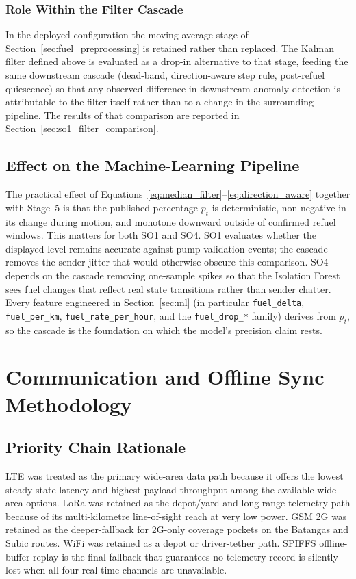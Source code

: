 \subsubsection{Role Within the Filter Cascade}
\label{sec:kalman_role_in_cascade}

In the deployed configuration the moving-average stage of Section~\ref{sec:fuel_preprocessing} is retained rather than replaced. The Kalman filter defined above is evaluated as a drop-in alternative to that stage, feeding the same downstream cascade (dead-band, direction-aware step rule, post-refuel quiescence) so that any observed difference in downstream anomaly detection is attributable to the filter itself rather than to a change in the surrounding pipeline. The results of that comparison are reported in Section~\ref{sec:so1_filter_comparison}.

\subsection{Effect on the Machine-Learning Pipeline}

The practical effect of Equations~\ref{eq:median_filter}--\ref{eq:direction_aware} together with Stage~5 is that the published percentage $p_t$ is deterministic, non-negative in its change during motion, and monotone downward outside of confirmed refuel windows. This matters for both SO1 and SO4. SO1 evaluates whether the displayed level remains accurate against pump-validation events; the cascade removes the sender-jitter that would otherwise obscure this comparison. SO4 depends on the cascade removing one-sample spikes so that the Isolation Forest sees fuel changes that reflect real state transitions rather than sender chatter. Every feature engineered in Section~\ref{sec:ml} (in particular \texttt{fuel\_delta}, \texttt{fuel\_per\_km}, \texttt{fuel\_rate\_per\_hour}, and the \texttt{fuel\_drop\_*} family) derives from $p_t$, so the cascade is the foundation on which the model's precision claim rests.

\section{Communication and Offline Sync Methodology}
\label{sec:communication}

\subsection{Priority Chain Rationale}
LTE was treated as the primary wide-area data path because it offers the lowest steady-state latency and highest payload throughput among the available wide-area options. LoRa was retained as the depot/yard and long-range telemetry path because of its multi-kilometre line-of-sight reach at very low power. GSM 2G was retained as the deeper-fallback for 2G-only coverage pockets on the Batangas and Subic routes. WiFi was retained as a depot or driver-tether path. SPIFFS offline-buffer replay is the final fallback that guarantees no telemetry record is silently lost when all four real-time channels are unavailable.


